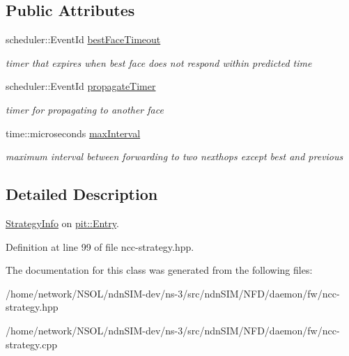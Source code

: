 \subsection*{Public Attributes}
\begin{DoxyCompactItemize}
\item 
scheduler\+::\+Event\+Id \hyperlink{classnfd_1_1fw_1_1NccStrategy_1_1PitEntryInfo_a2485042cdaed08e3c9ce20e9cc8eef9a}{best\+Face\+Timeout}\hypertarget{classnfd_1_1fw_1_1NccStrategy_1_1PitEntryInfo_a2485042cdaed08e3c9ce20e9cc8eef9a}{}\label{classnfd_1_1fw_1_1NccStrategy_1_1PitEntryInfo_a2485042cdaed08e3c9ce20e9cc8eef9a}

\begin{DoxyCompactList}\small\item\em timer that expires when best face does not respond within predicted time \end{DoxyCompactList}\item 
scheduler\+::\+Event\+Id \hyperlink{classnfd_1_1fw_1_1NccStrategy_1_1PitEntryInfo_a51169fbd0ba79c2119c8a9bd6988089c}{propagate\+Timer}\hypertarget{classnfd_1_1fw_1_1NccStrategy_1_1PitEntryInfo_a51169fbd0ba79c2119c8a9bd6988089c}{}\label{classnfd_1_1fw_1_1NccStrategy_1_1PitEntryInfo_a51169fbd0ba79c2119c8a9bd6988089c}

\begin{DoxyCompactList}\small\item\em timer for propagating to another face \end{DoxyCompactList}\item 
time\+::microseconds \hyperlink{classnfd_1_1fw_1_1NccStrategy_1_1PitEntryInfo_aaada55019acc07aa02f6c39aac7ce9fa}{max\+Interval}\hypertarget{classnfd_1_1fw_1_1NccStrategy_1_1PitEntryInfo_aaada55019acc07aa02f6c39aac7ce9fa}{}\label{classnfd_1_1fw_1_1NccStrategy_1_1PitEntryInfo_aaada55019acc07aa02f6c39aac7ce9fa}

\begin{DoxyCompactList}\small\item\em maximum interval between forwarding to two nexthops except best and previous \end{DoxyCompactList}\end{DoxyCompactItemize}


\subsection{Detailed Description}
\hyperlink{classnfd_1_1fw_1_1StrategyInfo}{Strategy\+Info} on \hyperlink{classnfd_1_1pit_1_1Entry}{pit\+::\+Entry}. 

Definition at line 99 of file ncc-\/strategy.\+hpp.



The documentation for this class was generated from the following files\+:\begin{DoxyCompactItemize}
\item 
/home/network/\+N\+S\+O\+L/ndn\+S\+I\+M-\/dev/ns-\/3/src/ndn\+S\+I\+M/\+N\+F\+D/daemon/fw/ncc-\/strategy.\+hpp\item 
/home/network/\+N\+S\+O\+L/ndn\+S\+I\+M-\/dev/ns-\/3/src/ndn\+S\+I\+M/\+N\+F\+D/daemon/fw/ncc-\/strategy.\+cpp\end{DoxyCompactItemize}
